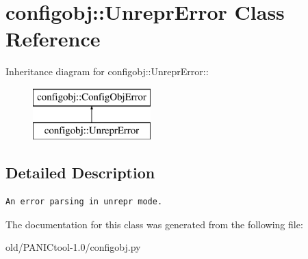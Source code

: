 \section{configobj::Unrepr\-Error Class Reference}
\label{classconfigobj_1_1UnreprError}
Inheritance diagram for configobj::Unrepr\-Error::\begin{figure}[H]
\begin{center}
\leavevmode
\includegraphics[height=2cm]{classconfigobj_1_1UnreprError}
\end{center}
\end{figure}


\subsection{Detailed Description}


\footnotesize\begin{verbatim}An error parsing in unrepr mode.\end{verbatim}
\normalsize
 



The documentation for this class was generated from the following file:\begin{CompactItemize}
\item 
old/PANICtool-1.0/configobj.py\end{CompactItemize}
